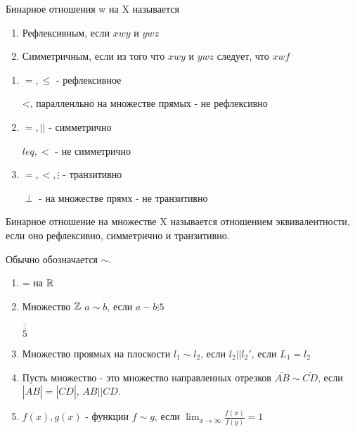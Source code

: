 \begin{definition}
    Бинарное отношения w на X называется

    \begin{enumerate}
        \item Рефлексивным, если $x w y$ и $y w z$
        \item Симметричным, если из того что $x w y$ и $y w z$ следует, что $x w f$
    \end{enumerate}
\end{definition}

\begin{eg}
    \begin{enumerate}
        \item $=, \leq$ - рефлексивное
        
        <, паралленльно на множестве прямых - не рефлексивно
        \item $=, ||$ - симметрично
        
        $leq, <$ - не симметрично
        \item $=, <, \vdots$ - транзитивно
        
        $\perp$ - на множестве прямх - не транзитивно 
    \end{enumerate}
\end{eg}

\begin{definition}
    Бинарное отношение на множестве X называется отношением эквивалентности, если оно рефлексивно, симметрично и транзитивно.

\end{definition}

\begin{notation}
    
    Обычно обозначается $\sim$.

\end{notation}

\begin{eg}
    
    \begin{enumerate}
        \item = на $\mathbb{R}$
        \item Множество $\mathbb{Z}$ $a \sim b$, если $a - b \vdots 5$
        \begin{notation}
            $\overline {\overline {\overline {5}}}$
        \end{notation}
        \item Множество проямых на плоскости $l_1 \sim l_2$, если $l_2 || l_2'$, если $L_1 = l_2$
        \item Пусть множество - это множество направленных отрезков $\overline{AB}  \sim \overline{CD}$, если $|\overline{AB}| = |\overline{CD}|$, $AB || CD$.
        \item $f(x),g(x)$ - функции $f \sim g$, если $\lim_{x\to\infty}\frac{f(x)}{f(y)} = 1$
    \end{enumerate}

\end{eg}

